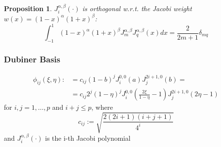 \documentclass[a4paper]{article}
\newtheorem*{prop}{Proposition}
\begin{document}
\begin{prop}
	$J_i^{\alpha,\beta}(\cdot)$ is orthogonal w.r.t. the Jacobi weight $w(x)=(1-x)^\alpha(1+x)^\beta$:
	\begin{equation}  \label{ref2}
	\int_{-1}^{1}{(1-x)^\alpha(1+x)^\beta J_m^{\alpha,\beta} J_q^{\alpha,\beta}(x)dx}=\frac{2}{2m+1} \delta_{mq} 
	\end{equation}
\end{prop}

\vspace{4mm}

\subsubsection{Dubiner Basis}
\vspace{4mm}
	\begin{equation}
	\begin{split}
	\phi_{ij}(\xi,\eta) :&= c_{ij}(1-b)^j J_i^{0,0}(a) J_j^{2i+1,0}(b)=
	\\&=c_{ij} 2^j (1-\eta)^j J_i^{0,0}(\frac{2\xi}{1-\eta}-1) J_j^{2i+1,0} (2\eta-1)
	\end{split}
	\end{equation}
	for $i,j=1,\dots,p$ and $i+j \le p$, where
	\begin{equation}
	c_{ij} := \sqrt{\frac{2(2i+1)(i+j+1)}{4^i}}
	\end{equation}
	and $J_i^{\alpha,\beta}(\cdot)$ is the i-th Jacobi polynomial

\vspace{4mm}
\end{document}
